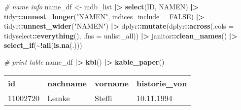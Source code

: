 \documentclass[
]{article}
\newenvironment{Shaded}{\begin{snugshade}}{\end{snugshade}}
\newcommand{\AttributeTok}[1]{\textcolor[rgb]{0.13,0.29,0.53}{#1}}
\newcommand{\CommentTok}[1]{\textcolor[rgb]{0.56,0.35,0.01}{\textit{#1}}}
\newcommand{\ConstantTok}[1]{\textcolor[rgb]{0.56,0.35,0.01}{#1}}
\newcommand{\FunctionTok}[1]{\textcolor[rgb]{0.13,0.29,0.53}{\textbf{#1}}}
\newcommand{\NormalTok}[1]{#1}
\newcommand{\OtherTok}[1]{\textcolor[rgb]{0.56,0.35,0.01}{#1}}
\newcommand{\SpecialCharTok}[1]{\textcolor[rgb]{0.81,0.36,0.00}{\textbf{#1}}}
\newcommand{\StringTok}[1]{\textcolor[rgb]{0.31,0.60,0.02}{#1}}
\begin{document}
\begin{Shaded}
\begin{Highlighting}[]
\CommentTok{\# name info}
\NormalTok{name\_df }\OtherTok{\textless{}{-}}\NormalTok{ mdb\_list }\SpecialCharTok{|\textgreater{}} 
  \FunctionTok{select}\NormalTok{(ID, NAMEN) }\SpecialCharTok{|\textgreater{}} 
\NormalTok{  tidyr}\SpecialCharTok{::}\FunctionTok{unnest\_longer}\NormalTok{(}\StringTok{"NAMEN"}\NormalTok{, }\AttributeTok{indices\_include =} \ConstantTok{FALSE}\NormalTok{) }\SpecialCharTok{|\textgreater{}} 
\NormalTok{  tidyr}\SpecialCharTok{::}\FunctionTok{unnest\_wider}\NormalTok{(}\StringTok{"NAMEN"}\NormalTok{) }\SpecialCharTok{|\textgreater{}} 
\NormalTok{  dplyr}\SpecialCharTok{::}\FunctionTok{mutate}\NormalTok{(dplyr}\SpecialCharTok{::}\FunctionTok{across}\NormalTok{(}\AttributeTok{.cols =}\NormalTok{ tidyselect}\SpecialCharTok{::}\FunctionTok{everything}\NormalTok{(),}
                              \AttributeTok{.fns =}\NormalTok{ unlist\_all)) }\SpecialCharTok{|\textgreater{}} 
\NormalTok{  janitor}\SpecialCharTok{::}\FunctionTok{clean\_names}\NormalTok{() }\SpecialCharTok{|\textgreater{}} 
  \FunctionTok{select\_if}\NormalTok{(}\SpecialCharTok{\textasciitilde{}!}\FunctionTok{all}\NormalTok{(}\FunctionTok{is.na}\NormalTok{(.)))}

\CommentTok{\# print table}
\NormalTok{name\_df }\SpecialCharTok{|\textgreater{}} 
  \FunctionTok{kbl}\NormalTok{() }\SpecialCharTok{|\textgreater{}} 
  \FunctionTok{kable\_paper}\NormalTok{()}
\end{Highlighting}
\end{Shaded}

\begin{table}
\centering
\begin{tabular}[t]{l|l|l|l}
\hline
id & nachname & vorname & historie\_von\\
\hline
11002720 & Lemke & Steffi & 10.11.1994\\
\hline
\end{tabular}
\end{table}
\end{document}
